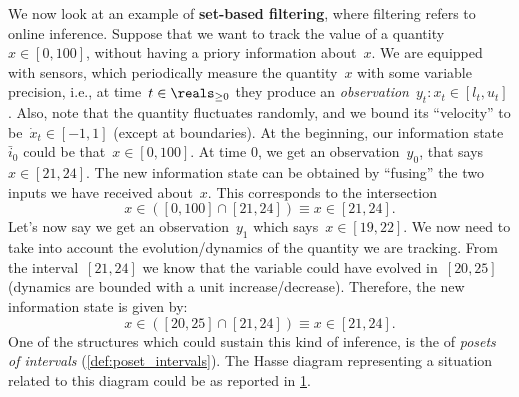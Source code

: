 \begin{example}
  We now look at an example of \textbf{set-based filtering}, where filtering refers to online inference.
  Suppose that we want to track the value of a quantity~$x\in [0,100]$, without having a priory information about~$x$.
  We are equipped with sensors, which periodically measure the quantity~$x$ with some variable precision, i.e., at time~$t\in \reals_{\geq 0}$ they produce an \emph{observation}~$y_t\colon x_t\in [l_t,u_t]$.
  Also, note that the quantity fluctuates randomly, and we bound its ``velocity'' to be~$\dot{x}_t\in [-1,1]$ (except at boundaries).
  At the beginning, our information state~$\bar{i}_0$ could be that~$x\in [0,100]$.
  At time 0, we get an observation~$y_0$, that says~$x\in [21,24]$.
  The new information state can be obtained by ``fusing'' the two inputs we have received about~$x$. This corresponds to the intersection
  \begin{equation*}
    x\in \left( [0,100] \cap [21,24]\right)\equiv x\in [21,24].
  \end{equation*}
  Let's now say we get an observation~$y_1$ which says~$x\in [19,22]$.
  We now need to take into account the evolution/dynamics of the quantity we are tracking. From the interval~$[21,24]$ we know that the variable could have evolved in~$[20,25]$ (dynamics are bounded with a unit increase/decrease). Therefore, the new information state is given by:
  \begin{equation*}
    x\in \left( [20,25] \cap [21,24]\right)\equiv x\in [21,24].
  \end{equation*}
  One of the structures which could sustain this kind of inference, is the of \emph{posets of intervals} (\cref{def:poset_intervals}).
  The Hasse diagram representing a situation related to this diagram could be as reported in \cref{fig:hasse_filtering}.
  \begin{figure}[h!]
  \begin{center}
  \end{center}
  \caption{\label{fig:hasse_filtering}}
  \end{figure}
\end{example}

